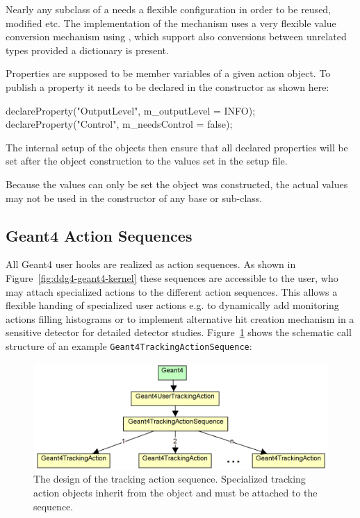 \noindent
Nearly any subclass of a  needs a flexible configuration 
in order to be reused, modified etc. The implementation of the mechanism
uses a very flexible value conversion mechanism using ,
which support also conversions between unrelated types provided a dictionary 
is present.

\noindent
Properties are supposed to be member variables of a given action object.
To publish a property it needs to be declared in the constructor as shown here:
\begin{unnumberedcode}
  declareProperty("OutputLevel", m_outputLevel = INFO);
  declareProperty("Control",     m_needsControl = false);
\end{unnumberedcode}
The internal setup of the  objects then ensure that 
all declared properties will be set after the object construction to the 
values set in the setup file.

\noindent
{} Because the values can only be set  the object 
was constructed, the actual values may not be used in the constructor
of any base or sub-class.

\subsection{Geant4 Action Sequences}
\label{sec:ddg4-user-manual-implementation-geant4action-sequences}

\noindent
All Geant4 user hooks are realized as action sequences. As shown in 
Figure~\ref{fig:ddg4-geant4-kernel} these sequences are accessible to the user,
who may attach specialized actions to the different action sequences. This 
allows a flexible handing of specialized user actions e.g. to dynamically
add monitoring actions filling histograms or to implement alternative hit 
creation mechanism in a sensitive detector for detailed detector studies.
Figure~\ref{fig:ddg4-implementation-sequence-calls} shows the schematic
call structure of an example {\tt{Geant4TrackingActionSequence}}:\\
\begin{figure}[h]
  \begin{center}
    \includegraphics[width=150mm] {DDG4-TrackingActionCalls.png}
    \caption{The design of the tracking action sequence. Specialized 
               tracking action objects inherit from the 
               object and must be attached to the sequence.}
    \label{fig:ddg4-implementation-sequence-calls}
  \end{center}
\end{figure}

